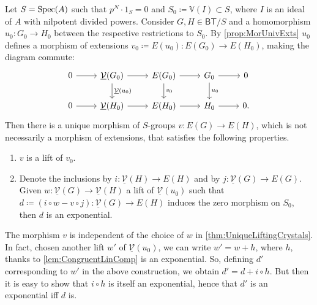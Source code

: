 \begin{thm}\label{thm:UniqueLiftingCrystals}
	Let $S = \operatorname{Spec}(A)$ such that $p^N \cdot 1_S = 0$ and
	$S_0 \coloneqq \mathbb{V}(I) \subset S$, where $I$ is
	an ideal of $A$ with nilpotent divided powers.
	Consider $G, H \in \mathsf{BT}/S$ and a homomorphism
	$u_0\colon G_0 \to H_0$ between the respective restrictions to $S_0$.
	By \cref{prop:MorUnivExts} $u_0$ defines
	a morphism of extensions $v_0 \coloneqq E(u_0)\colon E(G_0) \to E(H_0)$,
	making the diagram commute:
	\begin{equation*}
	\begin{tikzcd}
		0 \arrow[r, "", rightarrow] &
		\underline{\mathcal{V}}(G_0) \arrow[d, "\underline{\mathcal{V}}(u_0)", rightarrow] 
		\arrow[r, "", rightarrow] &
		E(G_0) \arrow[d, "v_0", rightarrow]
		\arrow[r, "", rightarrow] &
		G_0 \arrow[d, "u_0", rightarrow]
		\arrow[r, "", rightarrow] &
		0 \\
		0 \arrow[r, "", rightarrow] &
		\underline{\mathcal{V}}(H_0) \arrow[r, "", rightarrow] &
		E(H_0) \arrow[r, "", rightarrow] &
		H_0 \arrow[r, "", rightarrow] &
		0
	.\end{tikzcd}
	\end{equation*}
	Then there is a unique morphism of $S$-groups
	$v\colon E(G) \to E(H)$, which is not necessarily a morphism
	of extensions, that satisfies the following properties.
\begin{enumerate}
	\item $v$ is a lift of $v_0$.

	\item Denote the inclusions by $i\colon \underline{\mathcal{V}}(H) \to E(H)$ and by 
		$j\colon \underline{\mathcal{V}}(G) \to E(G)$.
		Given $w\colon \underline{\mathcal{V}}(G) \to \underline{\mathcal{V}}(H)$
		a lift of $\underline{\mathcal{V}}(u_0)$
		such that $d\coloneqq (i \circ w - v \circ j)\colon \underline{\mathcal{V}}(G) \to E(H)$
		induces the zero morphism on $S_0$, then $d$ is an exponential.
\end{enumerate}
\end{thm}


\begin{rem}
	The morphism $v$ is independent of the choice of $w$
	in \cref{thm:UniqueLiftingCrystals}.
	In fact, chosen another lift $w'$ of $\underline{\mathcal{V}}(u_0)$, we 
	can write $w' = w + h$, where $h$, thanks to \cref{lem:CongruentLinComp}
	is an exponential.
	So, defining $d'$ corresponding to $w'$ in the
	above construction, we obtain $d' = d + i \circ h$.
	But then it is easy to show that $i \circ h$ is
	itself an exponential, hence that $d'$ is an
	exponential iff $d$ is.
\end{rem}


